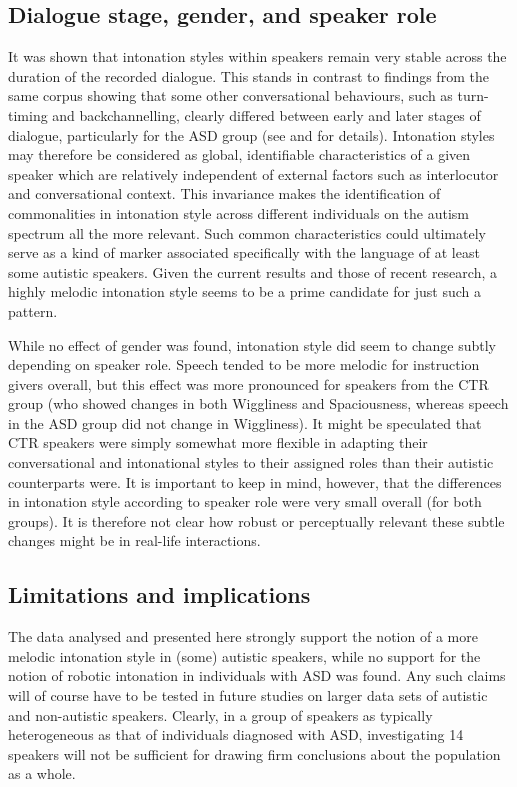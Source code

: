 	\subsection{Dialogue stage, gender, and speaker role}\label{int_disc_part_role}

It was shown that intonation styles within speakers remain very stable across the duration of the recorded dialogue. This stands in contrast to findings from the same corpus showing that some other conversational behaviours, such as turn-timing and backchannelling, clearly differed between early and later stages of dialogue, particularly for the ASD group (see  and  for details). Intonation styles may therefore be considered as global, identifiable characteristics of a given speaker which are relatively independent of external factors such as interlocutor and conversational context. This invariance makes the identification of commonalities in intonation style across different individuals on the autism spectrum all the more relevant. Such common characteristics could ultimately serve as a kind of marker associated specifically with the language of at least some autistic speakers. Given the current results and those of recent research, a highly melodic intonation style seems to be a prime candidate for just such a pattern.

While no effect of gender was found, intonation style did seem to change subtly depending on speaker role. Speech tended to be more melodic for instruction givers overall, but this effect was more pronounced for speakers from the CTR group (who showed changes in both Wiggliness and Spaciousness, whereas speech in the ASD group did not change in Wiggliness). It might be speculated that CTR speakers were simply somewhat more flexible in adapting their conversational and intonational styles to their assigned roles than their autistic counterparts were. It is important to keep in mind, however, that the differences in intonation style according to speaker role were very small overall (for both groups). It is therefore not clear how robust or perceptually relevant these subtle changes might be in real-life interactions.

	\subsection{Limitations and implications}\label{intonation_limitations}

The data analysed and presented here strongly support the notion of a more melodic intonation style in (some) autistic speakers, while no support for the notion of robotic intonation in individuals with ASD was found. Any such claims will of course have to be tested in future studies on larger data sets of autistic and non-autistic speakers. Clearly, in a group of speakers as typically heterogeneous as that of individuals diagnosed with ASD, investigating 14 speakers will not be sufficient for drawing firm conclusions about the population as a whole.

